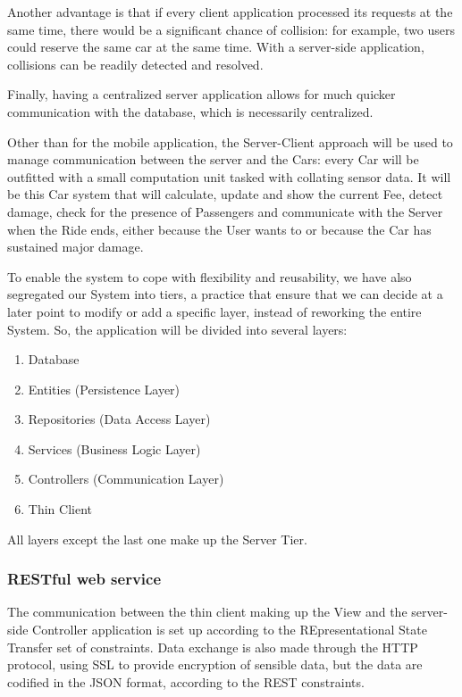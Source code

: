 \documentclass[12pt]{article}
\begin{document}
Another advantage is that if every client application processed its requests at the same time, there would be a significant chance of collision: for example, two users could reserve the same car at the same time. With a server-side application, collisions can be readily detected and resolved.

Finally, having a centralized server application allows for much quicker communication with the database, which is necessarily centralized.

Other than for the mobile application, the Server-Client approach will be used to manage communication between the server and the Cars: every Car will be outfitted with a small computation unit tasked with collating sensor data. It will be this Car system that will calculate, update and show the current Fee, detect damage, check for the presence of Passengers and communicate with the Server when the Ride ends, either because the User wants to or because the Car has sustained major damage.

To enable the system to cope with flexibility and reusability, we have also segregated our System into tiers, a practice that ensure that we can decide at a later point to modify or add a specific layer, instead of reworking the entire System.
So, the application will be divided into several layers:
\begin{enumerate}
	\item Database
	\item Entities (Persistence Layer)
	\item Repositories (Data Access Layer)
	\item Services (Business Logic Layer)
	\item Controllers (Communication Layer)
	\item Thin Client
\end{enumerate}
All layers except the last one make up the Server Tier.

\subsubsection{RESTful web service}\label{sec:rest}
The communication between the thin client making up the View and the server-side Controller application is set up according to the REpresentational State Transfer set of constraints. Data exchange is also made through the HTTP protocol, using SSL to provide encryption of sensible data, but the data are codified in the JSON format, according to the REST constraints.
\end{document}
